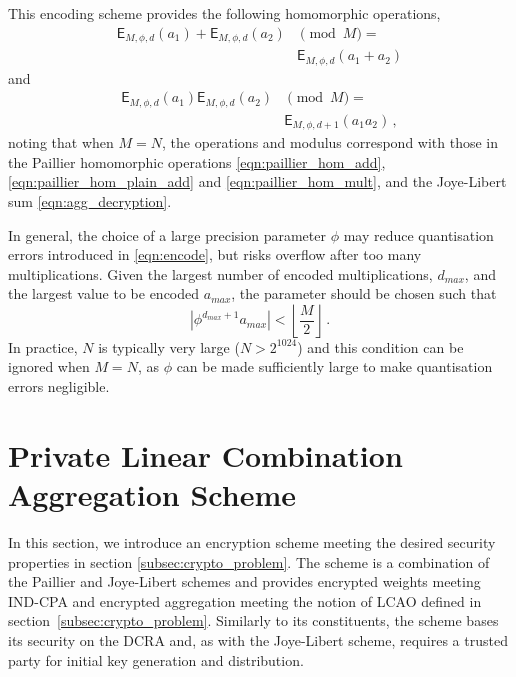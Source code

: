 \documentclass[10pt,letterpaper,oneside,twocolumn,journal]{IEEEtran}
\theoremstyle{definition}
\theoremstyle{definition}
\theoremstyle{remark}
\begin{document}
This encoding scheme provides the following homomorphic operations,
\begin{equation}
    \begin{split}
        \mathsf{E}_{M,\phi,d}(a_1) + \mathsf{E}_{M,\phi,d}(a_2)& \pmod{M} =\\
        &\mathsf{E}_{M,\phi,d}(a_1+a_2)
    \end{split}\label{eqn:encoding_homomorphic_add}
\end{equation}
and
\begin{equation}
    \begin{split}
        \mathsf{E}_{M,\phi,d}(a_1)\mathsf{E}_{M,\phi,d}(a_2)& \pmod{M} =\\
        &\mathsf{E}_{M,\phi,d+1}(a_1a_2)\,,
    \end{split}
\end{equation}
noting that when $M=N$, the operations and modulus correspond with those in the Paillier homomorphic operations \eqref{eqn:paillier_hom_add}, \eqref{eqn:paillier_hom_plain_add} and \eqref{eqn:paillier_hom_mult}, and the Joye-Libert sum \eqref{eqn:agg_decryption}.

In general, the choice of a large precision parameter $\phi$ may reduce quantisation errors introduced in \eqref{eqn:encode}, but risks overflow after too many multiplications. Given the largest number of encoded multiplications, $d_{max}$, and the largest value to be encoded $a_{max}$, the parameter should be chosen such that
\begin{equation}
    \left|\phi^{d_{max}+1}a_{max}\right| < \left\lfloor \frac{M}{2} \right\rfloor\,.
\end{equation}
In practice, $N$ is typically very large ($N>2^{1024}$) and this condition can be ignored when $M=N$, as $\phi$ can be made sufficiently large to make quantisation errors negligible.

% 
%                                            
%                                            
%                                            
% 

\section{Private Linear Combination Aggregation Scheme} \label{sec:lcao_scheme}
In this section, we introduce an encryption scheme meeting the desired security properties in section \ref{subsec:crypto_problem}. The scheme is a combination of the Paillier and Joye-Libert schemes and provides encrypted weights meeting IND-CPA and encrypted aggregation meeting the notion of LCAO defined in section~\ref{subsec:crypto_problem}. Similarly to its constituents, the scheme bases its security on the DCRA and, as with the Joye-Libert scheme, requires a trusted party for initial key generation and distribution. 
\end{document}
